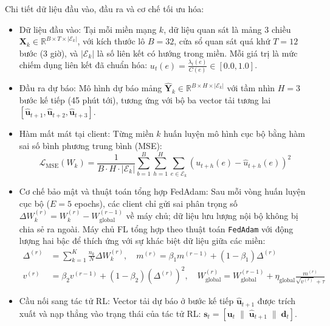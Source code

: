 \documentclass[11pt,a4paper]{article}
\begin{document}
Chi tiết dữ liệu đầu vào, đầu ra và cơ chế tối ưu hóa:
\begin{itemize}[leftmargin=1.5em, itemsep=0.2ex]
    \item Dữ liệu đầu vào: Tại mỗi miền mạng $k$, dữ liệu quan sát là mảng 3 chiều $\mathbf{X}_k \in \mathbb{R}^{B \times T \times |\mathcal{E}_k|}$, với kích thước lô $B = 32$, cửa sổ quan sát quá khứ $T = 12$ bước (3 giờ), và $|\mathcal{E}_k|$ là số liên kết có hướng trong miền. Mỗi giá trị là mức chiếm dụng liên kết đã chuẩn hóa: $u_t(e) = \frac{\lambda_t(e)}{C(e)} \in [0.0, 1.0]$.
    \item Đầu ra dự báo: Mô hình dự báo mảng $\mathbf{\hat{Y}}_k \in \mathbb{R}^{B \times H \times |\mathcal{E}_k|}$ với tầm nhìn $H = 3$ bước kế tiếp (45 phút tới), tương ứng với bộ ba vector tải tương lai $[\mathbf{\hat{u}}_{t+1}, \mathbf{\hat{u}}_{t+2}, \mathbf{\hat{u}}_{t+3}]$.
    \item Hàm mất mát tại client: Từng miền $k$ huấn luyện mô hình cục bộ bằng hàm sai số bình phương trung bình (MSE):
    \begin{equation}
        \mathcal{L}_{\text{MSE}}(W_k) = \frac{1}{B \cdot H \cdot |\mathcal{E}_k|} \sum_{b=1}^{B} \sum_{h=1}^{H} \sum_{e \in \mathcal{E}_k} \left( u_{t+h}(e) - \hat{u}_{t+h}(e) \right)^2
    \end{equation}
    \item Cơ chế bảo mật và thuật toán tổng hợp FedAdam: Sau mỗi vòng huấn luyện cục bộ ($E = 5$ epochs), các client chỉ gửi sai phân trọng số $\Delta W_k^{(r)} = W_k^{(r)} - W_{\text{global}}^{(r-1)}$ về máy chủ; dữ liệu lưu lượng nội bộ không bị chia sẻ ra ngoài. Máy chủ FL tổng hợp theo thuật toán \texttt{FedAdam} với động lượng hai bậc để thích ứng với sự khác biệt dữ liệu giữa các miền:
    \begin{align}
        \Delta^{(r)} &= \sum_{k=1}^{K} \frac{n_k}{N} \Delta W_k^{(r)}, \quad m^{(r)} = \beta_1 m^{(r-1)} + (1-\beta_1)\Delta^{(r)} \\
        v^{(r)} &= \beta_2 v^{(r-1)} + (1-\beta_2)(\Delta^{(r)})^2, \quad W_{\text{global}}^{(r)} = W_{\text{global}}^{(r-1)} + \eta_{\text{global}} \frac{m^{(r)}}{\sqrt{v^{(r)}} + \tau}
    \end{align}
    \item Cầu nối sang tác tử RL: Vector tải dự báo ở bước kế tiếp $\mathbf{\hat{u}}_{t+1}$ được trích xuất và nạp thẳng vào trạng thái của tác tử RL: $\mathbf{s}_t = [\mathbf{u}_t \;\parallel\; \mathbf{\hat{u}}_{t+1} \;\parallel\; \mathbf{d}_t]$.
\end{itemize}
\end{document}
